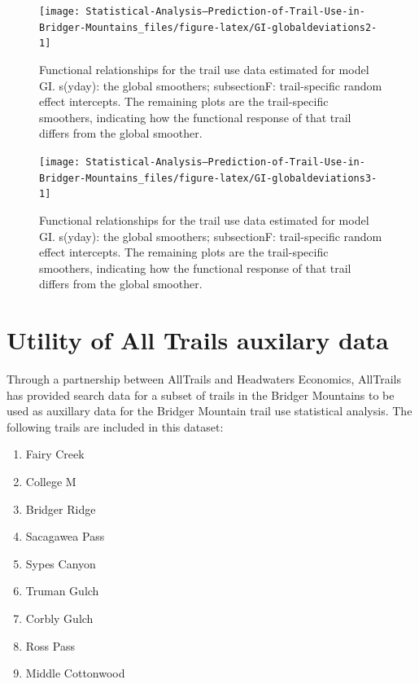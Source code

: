 \documentclass[
]{book}
\providecommand{\tightlist}{%
  \setlength{\itemsep}{0pt}\setlength{\parskip}{0pt}}
\begin{document}
\begin{figure}

{\centering \texttt{[image: Statistical-Analysis--Prediction-of-Trail-Use-in-Bridger-Mountains\_files/figure-latex/GI-globaldeviations2-1]} 

}

\caption{Functional relationships for the trail use data estimated for model GI. s(yday): the global smoothers; subsectionF: trail-specific random effect intercepts. The remaining plots are the trail-specific smoothers, indicating how the functional response of that trail differs from the global smoother.}\label{fig:GI-globaldeviations2}
\end{figure}

\begin{figure}

{\centering \texttt{[image: Statistical-Analysis--Prediction-of-Trail-Use-in-Bridger-Mountains\_files/figure-latex/GI-globaldeviations3-1]} 

}

\caption{Functional relationships for the trail use data estimated for model GI. s(yday): the global smoothers; subsectionF: trail-specific random effect intercepts. The remaining plots are the trail-specific smoothers, indicating how the functional response of that trail differs from the global smoother.}\label{fig:GI-globaldeviations3}
\end{figure}

\cleardoublepage

\hypertarget{appendix-appendix}{%
\appendix}


\hypertarget{ATDataUtility}{%
\chapter{Utility of All Trails auxilary data}\label{ATDataUtility}}

Through a partnership between AllTrails and Headwaters Economics, AllTrails has provided search data for a subset of trails in the Bridger Mountains to be used as auxillary data for the Bridger Mountain trail use statistical analysis. The following trails are included in this dataset:

\begin{enumerate}
\def\labelenumi{\arabic{enumi}.}
\tightlist
\item
  Fairy Creek
\item
  College M
\item
  Bridger Ridge
\item
  Sacagawea Pass
\item
  Sypes Canyon
\item
  Truman Gulch
\item
  Corbly Gulch
\item
  Ross Pass
\item
  Middle Cottonwood
\end{enumerate}
\end{document}
